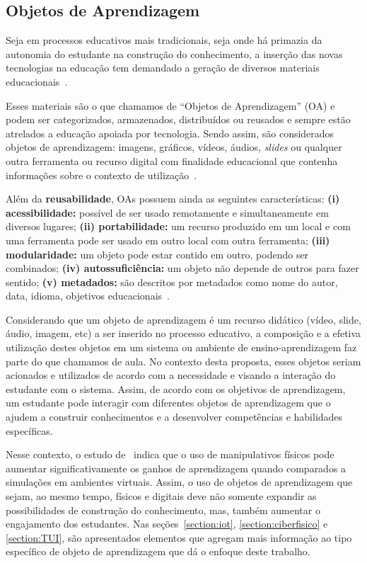 \subsection{Objetos de Aprendizagem}
Seja em processos educativos mais tradicionais, seja onde há primazia da autonomia do estudante na construção do conhecimento, a inserção das novas tecnologias na educação tem demandado a geração de diversos materiais educacionais~\citep{Tarouco:2004}.

Esses materiais são o que chamamos de ``Objetos de Aprendizagem'' (OA) e podem ser categorizados, armazenados, distribuídos ou reusados e sempre estão atrelados a educação apoiada por tecnologia. Sendo assim, são considerados objetos de aprendizagem: imagens, gráficos, vídeos, áudios, \textit{slides} ou qualquer outra ferramenta ou recurso digital com finalidade educacional que contenha informações sobre o contexto de utilização~\citep{Tarouco:2004}.

Além da \textbf{reusabilidade}, OAs possuem ainda as seguintes características: \textbf{(i) acessibilidade:} possível de ser usado remotamente e simultaneamente em diversos lugares; \textbf{(ii) portabilidade:} um recurso produzido em um local e com uma ferramenta pode ser usado em outro local com outra ferramenta; \textbf{(iii) modularidade:} um objeto pode estar contido em outro, podendo ser combinados; \textbf{(iv) autossuficiência:} um objeto não depende de outros para fazer sentido; \textbf{(v) metadados:} são descritos por metadados como nome do autor, data, idioma, objetivos educacionais~\citep{Tarouco:2004,Sabbatini:2013}.

Considerando que um objeto de aprendizagem é um recurso didático (vídeo, slide, áudio, imagem, etc) a ser inserido no processo educativo, a composição e a efetiva utilização destes objetos em um sistema ou ambiente de ensino-aprendizagem faz parte do que chamamos de aula. No contexto desta proposta, esses objetos seriam acionados e utilizados de acordo com a necessidade e visando a interação do estudante com o sistema. Assim, %
de acordo com os objetivos de aprendizagem, um estudante pode interagir com diferentes objetos de aprendizagem que o ajudem a construir conhecimentos e a desenvolver competências e habilidades específicas.

Nesse contexto, o estudo de~\cite{Salehi:2014} indica que o uso de manipulativos físicos pode aumentar significativamente os ganhos de aprendizagem quando comparados a simulações em ambientes virtuais. Assim, o uso de objetos de aprendizagem que sejam, ao mesmo tempo, físicos e digitais deve não somente expandir as possibilidades de construção do conhecimento, mas, também aumentar o engajamento dos estudantes. Nas seções~\ref{section:iot}, \ref{section:ciberfisico} e \ref{section:TUI}, são apresentados elementos que agregam mais informação ao tipo específico de objeto de aprendizagem que dá o enfoque deste trabalho.

